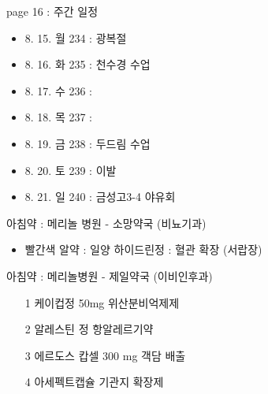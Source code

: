 \documentclass[aspectratio=1610,17pt,xcolor=pdftex,dvipsnames,table,handout]{beamer}
\begin{document}
		\begin{frame} [t,plain]

			\begin{block} { page 16 : 주간 일정}
			\begin{itemize}
			\item 	8. 15. 월 234 : 광복절
			\item 	8. 16. 화 235 : 천수경 수업
			\item 	8. 17. 수 236 : 
			\item 	8. 18. 목 237 : 
			\item 	8. 19. 금 238 : 두드림 수업
			\item 	8. 20. 토 239 : 이발
			\item 	8. 21. 일 240 : 금성고3-4 야유회
			\end{itemize}
			\end{block}			
								
		\end{frame}	 %



		\begin{frame} [t,plain]


			\begin{block} { 아침약 : 메리놀 병원 - 소망약국 (비뇨기과)  }
			\begin{itemize}
			\item 	빨간색 알약 :  일양 하이드린정 : 혈관 확장 (서랍장)
			\end{itemize}
			\end{block}		

			\begin{block} { 아침약 : 메리놀병원 - 제일약국 (이비인후과) }
			\begin{itemize}
			\item 	[1] 케이컵정 50mg  위산분비억제제
			\item 	[2] 알레스틴 정   항알레르기약
			\item 	[3] 에르도스 캅셀 300 mg 객담 배출
			\item 	[4] 아세펙트캡슐 기관지 확장제
			\end{itemize}
			\end{block}			

	
								
		\end{frame}	 %
\end{document}
